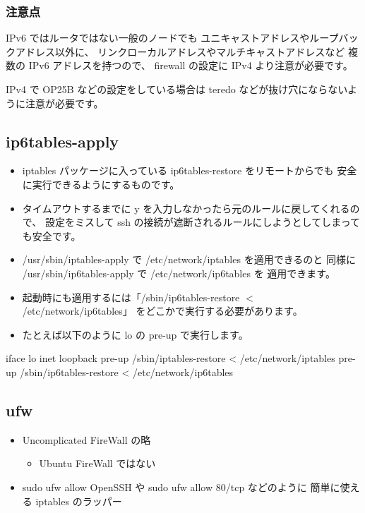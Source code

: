 \documentclass[mingoth,a4paper]{jsarticle}
\begin{document}
\subsubsection{注意点}


IPv6 ではルータではない一般のノードでも
ユニキャストアドレスやループバックアドレス以外に、
リンクローカルアドレスやマルチキャストアドレスなど
複数の IPv6 アドレスを持つので、
firewall の設定に IPv4 より注意が必要です。

IPv4 で OP25B などの設定をしている場合は
teredo などが抜け穴にならないように注意が必要です。
\subsection{ip6tables-apply}

\begin{itemize}
\item iptables パッケージに入っている ip6tables-restore をリモートからでも
  安全に実行できるようにするものです。
\item タイムアウトするまでに y を入力しなかったら元のルールに戻してくれるので、
  設定をミスして ssh の接続が遮断されるルールにしようとしてしまっても安全です。
\item /usr/sbin/iptables-apply で /etc/network/iptables を適用できるのと
  同様に /usr/sbin/ip6tables-apply で /etc/network/ip6tables を
  適用できます。
\item 起動時にも適用するには「/sbin/ip6tables-restore $<$ /etc/network/ip6tables」
  をどこかで実行する必要があります。
\item たとえば以下のように lo の pre-up で実行します。
\end{itemize}


\begin{commandline}
iface lo inet loopback
 pre-up /sbin/iptables-restore < /etc/network/iptables
 pre-up /sbin/ip6tables-restore < /etc/network/ip6tables
\end{commandline}
\subsection{ufw}

\begin{itemize}
\item Uncomplicated FireWall の略

\begin{itemize}
\item Ubuntu FireWall ではない
\end{itemize}

\item sudo ufw allow OpenSSH や sudo ufw allow 80/tcp などのように
  簡単に使える iptables のラッパー
\end{itemize}
\end{document}
